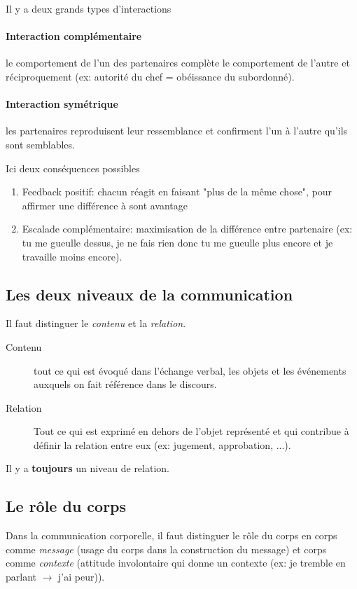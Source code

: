 \documentclass[11pt]{article} %
\begin{document}
	Il y a deux grands types d'interactions
	\paragraph{Interaction complémentaire} le comportement de l'un des partenaires complète le comportement de l'autre et réciproquement (ex: autorité du chef = obéissance du subordonné).

	\paragraph{Interaction symétrique} les partenaires reproduisent leur ressemblance et confirment l'un à l'autre qu'ils sont semblables.

	Ici deux conséquences possibles
	\begin{enumerate}
		\item Feedback positif: chacun réagit en faisant "plus de la même chose", pour affirmer une différence à sont avantage
		\item Escalade complémentaire: maximisation de la différence entre partenaire (ex: tu me gueulle dessus, je ne fais rien donc tu me gueulle plus encore et je travaille moins encore).
	\end{enumerate}

	\subsection{Les deux niveaux de la communication}

	Il faut distinguer le \textit{contenu} et la \textit{relation}. 

	\begin{description}
		\item[Contenu] tout ce qui est évoqué dans l'échange verbal, les objets et les événements auxquels on fait référence dans le discours.
		\item[Relation] Tout ce qui est exprimé en dehors de l'objet représenté et qui contribue à définir la relation entre eux (ex: jugement, approbation, ...).
	\end{description}

	Il y a \textbf{toujours} un niveau de relation.

	\subsection{Le rôle du corps}

	Dans la communication corporelle, il faut distinguer le rôle du corps en corps comme \textit{message} (usage du corps dans la construction du message) et corps comme \textit{contexte} (attitude involontaire qui donne un contexte (ex: je tremble en parlant $\rightarrow$ j'ai peur)).
\end{document}
